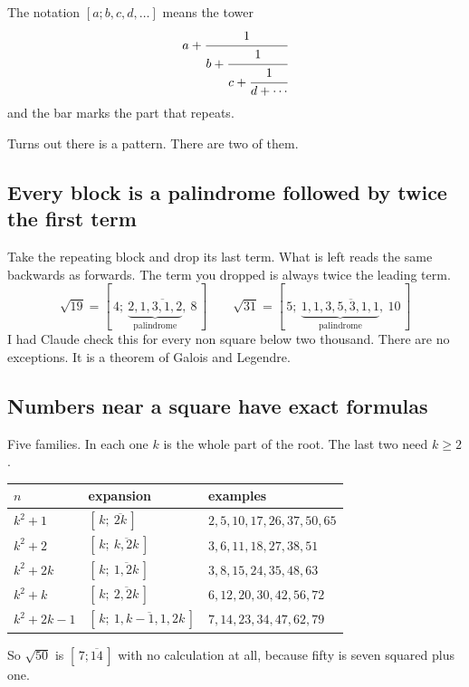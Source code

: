 \documentclass[11pt,a4paper]{article}
\theoremstyle{definition}
\theoremstyle{plain}
\begin{document}
The notation $[a; b, c, d, \ldots]$ means the tower
\[
  a + \cfrac{1}{b + \cfrac{1}{c + \cfrac{1}{d + \cdots}}}
\]
and the bar marks the part that repeats.

Turns out there is a pattern. There are two of them.

\subsection{Every block is a palindrome followed by twice the first term}

Take the repeating block and drop its last term. What is left reads the same
backwards as forwards. The term you dropped is always twice the leading term.
\[
  \sqrt{19} = [\,4;\ \overline{\underbrace{2,1,3,1,2}_{\text{palindrome}},\ 8}\,]
  \qquad
  \sqrt{31} = [\,5;\ \overline{\underbrace{1,1,3,5,3,1,1}_{\text{palindrome}},\ 10}\,]
\]
I had Claude check this for every non square below two thousand. There are no
exceptions. It is a theorem of Galois and Legendre.

\subsection{Numbers near a square have exact formulas}

Five families. In each one $k$ is the whole part of the root. The last two
need $k \geq 2$.

\begin{center}
\begin{tabular}{lll}
\toprule
$n$ & expansion & examples \\
\midrule
$k^2+1$    & $[\,k;\ \overline{2k}\,]$                & $2, 5, 10, 17, 26, 37, 50, 65$ \\
$k^2+2$    & $[\,k;\ \overline{k, 2k}\,]$             & $3, 6, 11, 18, 27, 38, 51$ \\
$k^2+2k$   & $[\,k;\ \overline{1, 2k}\,]$             & $3, 8, 15, 24, 35, 48, 63$ \\
$k^2+k$    & $[\,k;\ \overline{2, 2k}\,]$             & $6, 12, 20, 30, 42, 56, 72$ \\
$k^2+2k-1$ & $[\,k;\ \overline{1, k-1, 1, 2k}\,]$     & $7, 14, 23, 34, 47, 62, 79$ \\
\bottomrule
\end{tabular}
\end{center}

So $\sqrt{50}$ is $[\,7; \overline{14}\,]$ with no calculation at all, because
fifty is seven squared plus one.
\end{document}
